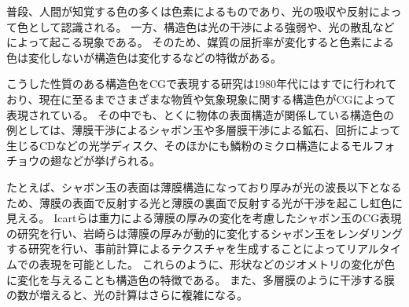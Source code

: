 普段、人間が知覚する色の多くは色素によるものであり、光の吸収や反射によって色として認識される。
一方、構造色は光の干渉による強弱や、光の散乱などによって起こる現象である。
そのため、媒質の屈折率が変化すると色素による色は変化しないが構造色は変化するなどの特徴がある。

こうした性質のある構造色をCGで表現する研究は1980年代にはすでに行われており、現在に至るまでさまざまな物質や気象現象に関する構造色がCGによって表現されている。
その中でも、とくに物体の表面構造が関係している構造色の例としては、薄膜干渉によるシャボン玉や多層膜干渉による鉱石、回折によって生じるCDなどの光学ディスク、そのほかにも鱗粉のミクロ構造によるモルフォチョウの翅などが挙げられる。

たとえば、シャボン玉の表面は薄膜構造になっており厚みが光の波長以下となるため、薄膜の表面で反射する光と薄膜の裏面で反射する光が干渉を起こし虹色に見える。
Icartら\cite{icart1999approach}は重力による薄膜の厚みの変化を考慮したシャボン玉のCG表現の研究を行い、岩崎ら\cite{iwasaki2004real}は薄膜の厚みが動的に変化するシャボン玉をレンダリングする研究を行い、事前計算によるテクスチャを生成することによってリアルタイムでの表現を可能とした。
これらのように、形状などのジオメトリの変化が色に変化を与えることも構造色の特徴である。
また、多層膜のように干渉する膜の数が増えると、光の計算はさらに複雑になる。


